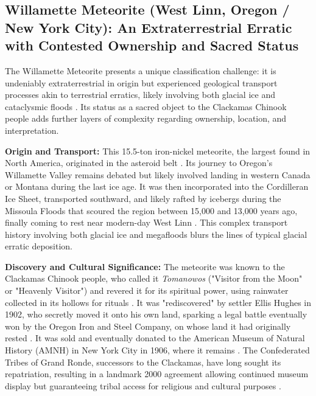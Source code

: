 \subsection{Willamette Meteorite (West Linn, Oregon / New York City): An Extraterrestrial Erratic with Contested Ownership and Sacred Status}
\label{subsec:willamette}

The Willamette Meteorite presents a unique classification challenge: it is undeniably extraterrestrial in origin but experienced geological transport processes akin to terrestrial erratics, likely involving both glacial ice and cataclysmic floods \cite{AMNHWillamette, Pasek2008}. Its status as a sacred object to the Clackamas Chinook people adds further layers of complexity regarding ownership, location, and interpretation.

\textbf{Origin and Transport:} This 15.5-ton iron-nickel meteorite, the largest found in North America, originated in the asteroid belt \cite{AMNHWillamette}. Its journey to Oregon's Willamette Valley remains debated but likely involved landing in western Canada or Montana during the last ice age. It was then incorporated into the Cordilleran Ice Sheet, transported southward, and likely rafted by icebergs during the Missoula Floods that scoured the region between 15,000 and 13,000 years ago, finally coming to rest near modern-day West Linn \cite{Pasek2008, Bretz1969}. This complex transport history involving both glacial ice and megafloods blurs the lines of typical glacial erratic deposition.

\textbf{Discovery and Cultural Significance:} The meteorite was known to the Clackamas Chinook people, who called it \emph{Tomanowos} ("Visitor from the Moon" or "Heavenly Visitor") and revered it for its spiritual power, using rainwater collected in its hollows for rituals \cite{statesmanjournalPiecesSacred, ourtimebdTomanowosMeteorite}. It was "rediscovered" by settler Ellis Hughes in 1902, who secretly moved it onto his own land, sparking a legal battle eventually won by the Oregon Iron and Steel Company, on whose land it had originally rested \cite{AMNHWillamette}. It was sold and eventually donated to the American Museum of Natural History (AMNH) in New York City in 1906, where it remains \cite{AMNHWillamette}. The Confederated Tribes of Grand Ronde, successors to the Clackamas, have long sought its repatriation, resulting in a landmark 2000 agreement allowing continued museum display but guaranteeing tribal access for religious and cultural purposes \cite{statesmanjournalPiecesSacred, ourtimebdTomanowosMeteorite}.

